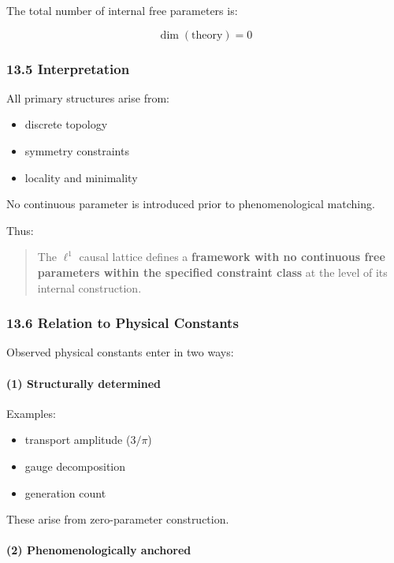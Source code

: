 \documentclass[
]{article}
\providecommand{\tightlist}{%
  \setlength{\itemsep}{0pt}\setlength{\parskip}{0pt}}
\begin{document}
The total number of internal free parameters is:

\[
\dim(\text{theory}) = 0
\]

\subsubsection{13.5 Interpretation}\label{interpretation-4}

All primary structures arise from:

\begin{itemize}
\tightlist
\item
  discrete topology
\item
  symmetry constraints
\item
  locality and minimality
\end{itemize}

No continuous parameter is introduced prior to phenomenological
matching.

Thus:

\begin{quote}
The \(\ell^1\) causal lattice defines a \textbf{framework with no
continuous free parameters within the specified constraint class} at the
level of its internal construction.
\end{quote}

\subsubsection{13.6 Relation to Physical
Constants}\label{relation-to-physical-constants}

Observed physical constants enter in two ways:

\paragraph{(1) Structurally determined}\label{structurally-determined}

Examples:

\begin{itemize}
\tightlist
\item
  transport amplitude (\(3/\pi\))
\item
  gauge decomposition
\item
  generation count
\end{itemize}

These arise from zero-parameter construction.

\paragraph{(2) Phenomenologically
anchored}\label{phenomenologically-anchored}
\end{document}
